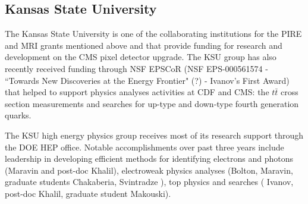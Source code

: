 
\subsection{Kansas State University}


The Kansas State University is one of the collaborating institutions for 
the PIRE and MRI grants
mentioned above and that provide funding for research and development on 
the CMS pixel detector upgrade. 
The KSU group has also recently received funding through NSF EPSCoR (NSF 
EPS-000561574 - 
``Towards New Discoveries at the Energy Frontier" (?) - Ivanov's First 
Award) that helped to support 
physics analyses activities at CDF and CMS: the $t\bar{t}$ cross section 
measurements and searches 
for up-type and down-type fourth generation quarks. 

The KSU high energy physics group receives most of its research support 
through the DOE HEP office.
Notable accomplishments over past three years include leadership in 
developing efficient methods 
for identifying electrons and photons (Maravin and post-doc Khalil), 
electroweak 
physics analyses (Bolton, Maravin, graduate students Chakaberia, 
Svintradze ), 
top physics and searches ( Ivanov, post-doc Khalil, graduate student 
Makouski).

